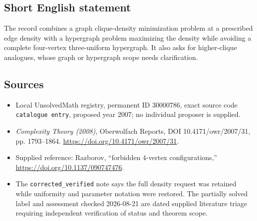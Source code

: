 \documentclass[11pt]{article}
\begin{document}
\subsection{Short English statement}
The record combines a graph clique-density minimization problem at a prescribed edge density with a hypergraph problem maximizing the density while avoiding a complete four-vertex three-uniform hypergraph. It also asks for higher-clique analogues, whose graph or hypergraph scope needs clarification.
\subsection{Sources}
\begin{itemize}
\item Local UnsolvedMath registry, permanent ID \(30000786\), exact source code \texttt{catalogue entry}, proposed year 2007; no individual proposer is supplied.
\item \emph{Complexity Theory (2008)}, Oberwolfach Reports, DOI 10.4171/owr/2007/31, pp. 1793--1864. \url{https://doi.org/10.4171/owr/2007/31}.
\item Supplied reference: Razborov, ``forbidden 4-vertex configurations,'' \url{https://doi.org/10.1137/090747476}.
\item The \texttt{corrected\_verified} note says the full density request was retained while uniformity and parameter notation were restored. The partially solved label and assessment checked 2026-08-21 are dated supplied literature triage requiring independent verification of status and theorem scope.
\end{itemize}
\end{document}
